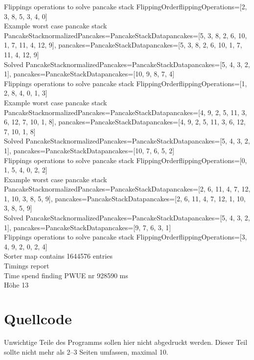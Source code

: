 Flippings operations to solve pancake stack FlippingOrder{flippingOperations=[2, 3, 8, 5, 3, 4, 0]} \\
Example worst case pancake stack PancakeStack{normalizedPancakes=PancakeStackData{pancakes=[5, 3, 8, 2, 6, 10, 1, 7, 11, 4, 12, 9]}, pancakes=PancakeStackData{pancakes=[5, 3, 8, 2, 6, 10, 1, 7, 11, 4, 12, 9]}} \\
Solved PancakeStack{normalizedPancakes=PancakeStackData{pancakes=[5, 4, 3, 2, 1]}, pancakes=PancakeStackData{pancakes=[10, 9, 8, 7, 4]}} \\
Flippings operations to solve pancake stack FlippingOrder{flippingOperations=[1, 2, 8, 4, 0, 1, 3]} \\
Example worst case pancake stack PancakeStack{normalizedPancakes=PancakeStackData{pancakes=[4, 9, 2, 5, 11, 3, 6, 12, 7, 10, 1, 8]}, pancakes=PancakeStackData{pancakes=[4, 9, 2, 5, 11, 3, 6, 12, 7, 10, 1, 8]}} \\
Solved PancakeStack{normalizedPancakes=PancakeStackData{pancakes=[5, 4, 3, 2, 1]}, pancakes=PancakeStackData{pancakes=[10, 7, 6, 5, 2]}} \\
Flippings operations to solve pancake stack FlippingOrder{flippingOperations=[0, 1, 5, 4, 0, 2, 2]} \\
Example worst case pancake stack PancakeStack{normalizedPancakes=PancakeStackData{pancakes=[2, 6, 11, 4, 7, 12, 1, 10, 3, 8, 5, 9]}, pancakes=PancakeStackData{pancakes=[2, 6, 11, 4, 7, 12, 1, 10, 3, 8, 5, 9]}} \\
Solved PancakeStack{normalizedPancakes=PancakeStackData{pancakes=[5, 4, 3, 2, 1]}, pancakes=PancakeStackData{pancakes=[9, 7, 6, 3, 1]}} \\
Flippings operations to solve pancake stack FlippingOrder{flippingOperations=[3, 4, 9, 2, 0, 2, 4]} \\
Sorter map contains 1644576 entries \\
Timings report \\
Time spend finding PWUE nr 928590 ms \\

Höhe 13 \\


\section{Quellcode}\label{sec:quellcode}
Unwichtige Teile des Programms sollen hier nicht abgedruckt werden.
Dieser Teil sollte nicht mehr als 2–3 Seiten umfassen, maximal 10.

